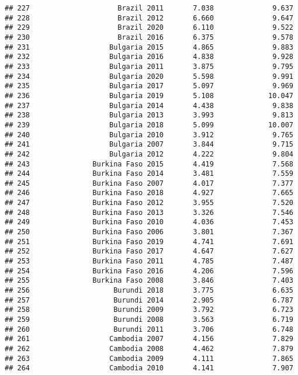 \documentclass[
]{article}
\begin{document}
\begin{verbatim}
## 227                     Brazil 2011       7.038              9.637
## 228                     Brazil 2012       6.660              9.647
## 229                     Brazil 2020       6.110              9.522
## 230                     Brazil 2016       6.375              9.578
## 231                   Bulgaria 2015       4.865              9.883
## 232                   Bulgaria 2016       4.838              9.928
## 233                   Bulgaria 2011       3.875              9.795
## 234                   Bulgaria 2020       5.598              9.991
## 235                   Bulgaria 2017       5.097              9.969
## 236                   Bulgaria 2019       5.108             10.047
## 237                   Bulgaria 2014       4.438              9.838
## 238                   Bulgaria 2013       3.993              9.813
## 239                   Bulgaria 2018       5.099             10.007
## 240                   Bulgaria 2010       3.912              9.765
## 241                   Bulgaria 2007       3.844              9.715
## 242                   Bulgaria 2012       4.222              9.804
## 243               Burkina Faso 2015       4.419              7.568
## 244               Burkina Faso 2014       3.481              7.559
## 245               Burkina Faso 2007       4.017              7.377
## 246               Burkina Faso 2018       4.927              7.665
## 247               Burkina Faso 2012       3.955              7.520
## 248               Burkina Faso 2013       3.326              7.546
## 249               Burkina Faso 2010       4.036              7.453
## 250               Burkina Faso 2006       3.801              7.367
## 251               Burkina Faso 2019       4.741              7.691
## 252               Burkina Faso 2017       4.647              7.627
## 253               Burkina Faso 2011       4.785              7.487
## 254               Burkina Faso 2016       4.206              7.596
## 255               Burkina Faso 2008       3.846              7.403
## 256                    Burundi 2018       3.775              6.635
## 257                    Burundi 2014       2.905              6.787
## 258                    Burundi 2009       3.792              6.723
## 259                    Burundi 2008       3.563              6.719
## 260                    Burundi 2011       3.706              6.748
## 261                   Cambodia 2007       4.156              7.829
## 262                   Cambodia 2008       4.462              7.879
## 263                   Cambodia 2009       4.111              7.865
## 264                   Cambodia 2010       4.141              7.907

\end{verbatim}
\end{document}
